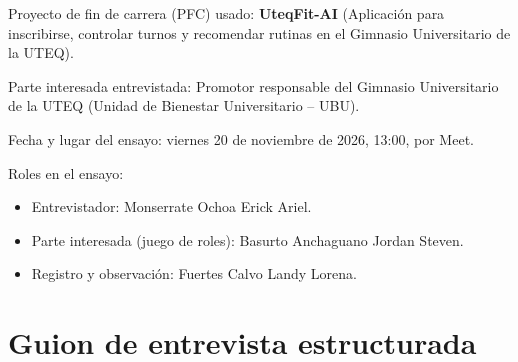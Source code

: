 \documentclass[12pt,a4paper]{article}
\begin{document}
Proyecto de fin de carrera (PFC) usado: \textbf{UteqFit-AI} (Aplicación para inscribirse, controlar turnos y recomendar rutinas en el Gimnasio Universitario de la UTEQ).

Parte interesada entrevistada: Promotor responsable del Gimnasio Universitario de la UTEQ (Unidad de Bienestar Universitario -- UBU).

Fecha y lugar del ensayo: viernes 20 de noviembre de 2026, 13:00, por Meet.

Roles en el ensayo:
\begin{itemize}[noitemsep]
    \item Entrevistador: Monserrate Ochoa Erick Ariel.
    \item Parte interesada (juego de roles): Basurto Anchaguano Jordan Steven.
    \item Registro y observación: Fuertes Calvo Landy Lorena.
\end{itemize}

\section{Guion de entrevista estructurada}

\end{document}
